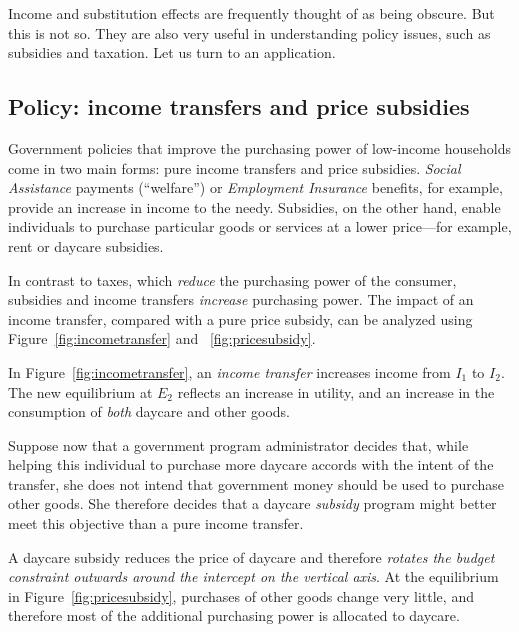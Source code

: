 Income and substitution effects are frequently thought of as being obscure. But this is not so. They are also very useful in understanding policy issues, such as subsidies and taxation. Let us turn to an application.

\subsection*{Policy: income transfers and price subsidies}

Government policies that improve the purchasing power of low-income households come in two main forms: pure income transfers and price subsidies. \textit{Social Assistance} payments (``welfare'') or \textit{Employment Insurance} benefits, for example, provide an increase in income to the needy. Subsidies, on the other hand, enable individuals to purchase particular goods or services at a lower price---for example, rent or daycare subsidies.

In contrast to taxes, which \textit{reduce} the purchasing power of the consumer, subsidies and income transfers \textit{increase} purchasing power. The impact of an income transfer, compared with a pure price subsidy, can be analyzed using Figure~\ref{fig:incometransfer} and ~\ref{fig:pricesubsidy}.





In Figure~\ref{fig:incometransfer}, an \textit{income transfer} increases income from $I_1$ to $I_2$. The new equilibrium at $E_2$ reflects an increase in utility, and an increase in the consumption of \textit{both} daycare and other goods.

Suppose now that a government program administrator decides that, while helping this individual to purchase more daycare accords with the intent of the transfer, she does not intend that government money should be used to purchase other goods. She therefore decides that a daycare \textit{subsidy} program might better meet this objective than a pure income transfer.

A daycare subsidy reduces the price of daycare and therefore \textit{rotates the budget constraint outwards around the intercept on the vertical axis}. At the equilibrium in Figure~\ref{fig:pricesubsidy}, purchases of other goods change very little, and therefore most of the additional purchasing power is allocated to daycare.

